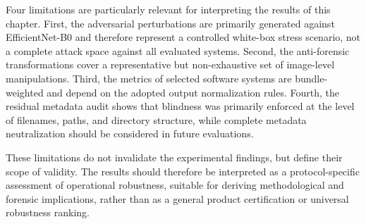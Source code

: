 Four limitations are particularly relevant for interpreting the results of this
chapter. First, the adversarial perturbations are primarily generated against
EfficientNet-B0 and therefore represent a controlled white-box stress scenario,
not a complete attack space against all evaluated systems. Second, the
anti-forensic transformations cover a representative but non-exhaustive set of
image-level manipulations. Third, the metrics of selected software systems are
bundle-weighted and depend on the adopted output normalization rules. Fourth,
the residual metadata audit shows that blindness was primarily enforced at the
level of filenames, paths, and directory structure, while complete metadata
neutralization should be considered in future evaluations.

These limitations do not invalidate the experimental findings, but define their
scope of validity. The results should therefore be interpreted as a
protocol-specific assessment of operational robustness, suitable for deriving
methodological and forensic implications, rather than as a general product
certification or universal robustness ranking.





















